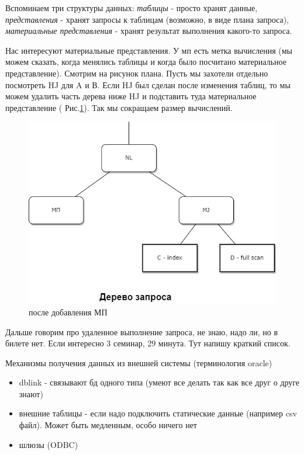 Вспоминаем три структуры данных: \textit{таблицы} - просто хранят данные, \textit{представления} -  хранят запросы к таблицам (возможно, в виде плана запроса), \textit{материальные представления} - хранят результат выполнения какого-то запроса. 

Нас интересуют материальные представления. У мп есть метка вычисления (мы можем сказать, когда менялись таблицы и когда было посчитано материальное представление). Смотрим на рисунок плана. Пусть мы захотели отдельно посмотреть HJ для A и В. Если HJ был сделан после изменения таблиц, то мы можем удалить часть дерева ниже HJ и подставить туда материальное представление ( Рис.\ref{fig:plan2}). Так мы сокращаем размер вычислений.  

\begin{figure}[H]
	\centering
	\includegraphics[scale = 0.5]{5/plan2.jpg}
	\caption{после добавления МП}
	\label{fig:plan2}
\end{figure}

\color{olive} Дальше говорим про удаленное выполнение запроса, не знаю, надо ли, но в билете нет. Если интересно 3 семинар, 29 минута. Тут напишу краткий список. 
\color{black}

Механизмы получения данных из внешней системы (терминология  oracle)
\begin{itemize}
	\item  dblink -  связывают бд одного типа (умеют все делать так как все друг о друге знают)
	\item внешние таблицы - если надо подключить статические данные (например csv файл). Может быть медленным, особо ничего нет
	\item шлюзы (ODBC) 
\end{itemize}
